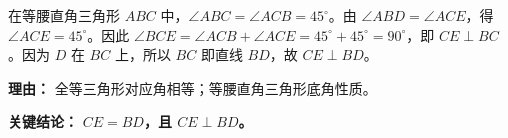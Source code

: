 \begin{examplebox}
\begin{description}[style=nextline, leftmargin=2.8em, labelsep=0.5em, itemsep=0.45em]
		\item[\textbf{第三步（垂直证明）：}]
			在等腰直角三角形 $ABC$ 中，$\angle ABC = \angle ACB = 45^\circ$。由 $\angle ABD = \angle ACE$，得 $\angle ACE = 45^\circ$。因此 $\angle BCE = \angle ACB + \angle ACE = 45^\circ + 45^\circ = 90^\circ$，即 $CE \perp BC$。因为 $D$ 在 $BC$ 上，所以 $BC$ 即直线 $BD$，故 $CE \perp BD$。
			\par\textbf{理由：}
			全等三角形对应角相等；等腰直角三角形底角性质。
	\end{description}

	\textbf{\textcolor{CExample}{关键结论：}}
	\textbf{$CE = BD$，且 $CE \perp BD$。}
\end{examplebox}
